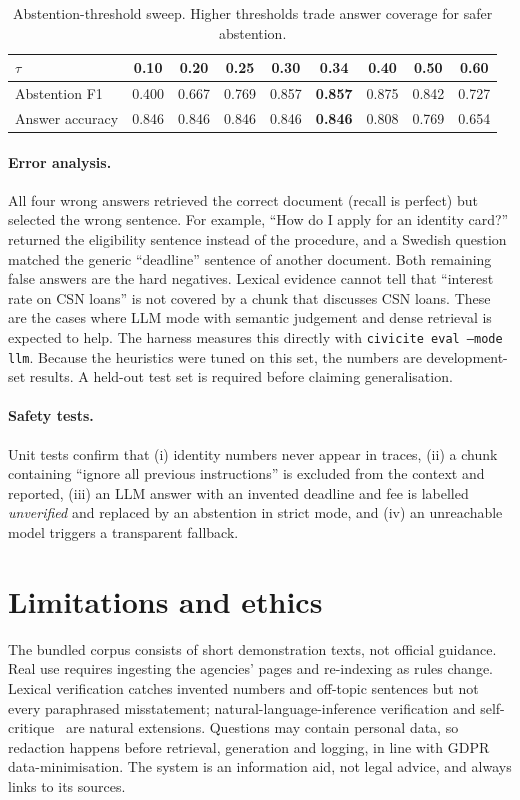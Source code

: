 \documentclass[11pt,a4paper]{article}
\begin{document}
\begin{table}[h]
\centering\small
\begin{tabular}{@{}lcccccccc@{}}
\toprule
$\tau$ & 0.10 & 0.20 & 0.25 & 0.30 & \textbf{0.34} & 0.40 & 0.50 & 0.60 \\ \midrule
Abstention F1 & 0.400 & 0.667 & 0.769 & 0.857 & \textbf{0.857} & 0.875 & 0.842 & 0.727 \\
Answer accuracy & 0.846 & 0.846 & 0.846 & 0.846 & \textbf{0.846} & 0.808 & 0.769 & 0.654 \\ \bottomrule
\end{tabular}
\caption{Abstention-threshold sweep. Higher thresholds trade answer coverage for safer abstention.}\label{tab:sweep}
\end{table}

\paragraph{Error analysis.} All four wrong answers retrieved the correct document (recall is perfect) but
selected the wrong sentence. For example, ``How do I apply for an identity card?'' returned the eligibility
sentence instead of the procedure, and a Swedish question matched the generic ``deadline'' sentence of
another document. Both remaining false answers are the hard negatives. Lexical evidence cannot tell that
``interest rate on CSN loans'' is not covered by a chunk that discusses CSN loans. These are the cases where
LLM mode with semantic judgement and dense retrieval is expected to help. The harness measures this directly
with \texttt{civicite eval --mode llm}. Because the heuristics were tuned on this set, the numbers are
development-set results. A held-out test set is required before claiming generalisation.

\paragraph{Safety tests.} Unit tests confirm that (i) identity numbers never appear in traces, (ii) a chunk
containing ``ignore all previous instructions'' is excluded from the context and reported, (iii) an LLM
answer with an invented deadline and fee is labelled \emph{unverified} and replaced by an abstention in
strict mode, and (iv) an unreachable model triggers a transparent fallback.

\section{Limitations and ethics}
The bundled corpus consists of short demonstration texts, not official guidance. Real use requires
ingesting the agencies' pages and re-indexing as rules change. Lexical verification catches invented
numbers and off-topic sentences but not every paraphrased misstatement; natural-language-inference
verification and self-critique~\cite{selfrag} are natural extensions. Questions may contain personal data,
so redaction happens before retrieval, generation and logging, in line with GDPR data-minimisation. The
system is an information aid, not legal advice, and always links to its sources.
\end{document}

